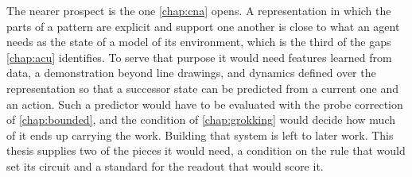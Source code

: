 The nearer prospect is the one \cref{chap:cna} opens. A representation in
which the parts of a pattern are explicit and support one another is close to
what an agent needs as the state of a model of its environment, which is the
third of the gaps \cref{chap:acu} identifies. To serve that purpose it would
need features learned from data, a demonstration beyond line drawings, and dynamics defined over the representation so that a
successor state can be predicted from a current one and an action. Such a
predictor would have to be evaluated with the probe correction of
\cref{chap:bounded}, and the condition of \cref{chap:grokking} would decide
how much of it ends up carrying the work. Building that system is left to
later work. This thesis supplies two of the pieces it would need, a condition
on the rule that would set its circuit and a standard for the readout that
would score it.
